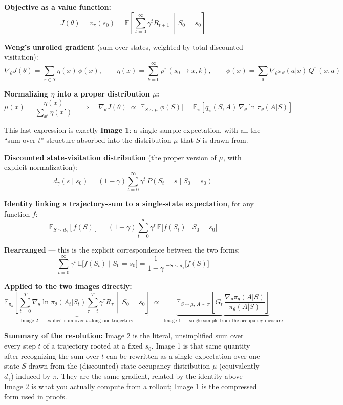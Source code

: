 \begin{tcolorbox}[title = Reason for equivalence, breakable]

    \textbf{Objective as a value function:}
    \[
    J(\theta) = v_\pi(s_0) = \mathbb{E}\left[\sum_{t=0}^{\infty}\gamma^t R_{t+1} \,\middle|\, S_0 = s_0\right]
    \]

    \textbf{Weng's unrolled gradient} (sum over states, weighted by total discounted visitation):
    \[
    \nabla_\theta J(\theta) = \sum_{x \in \mathcal{S}} \eta(x)\,\phi(x), 
    \qquad 
    \eta(x) = \sum_{k=0}^{\infty} \rho^\pi(s_0 \to x, k),
    \qquad 
    \phi(x) = \sum_{a} \nabla_\theta \pi_\theta(a|x)\, Q^\pi(x,a)
    \]

    \textbf{Normalizing $\eta$ into a proper distribution $\mu$:}
    \[
    \mu(x) = \frac{\eta(x)}{\sum_{x'} \eta(x')}
    \quad\Longrightarrow\quad
    \nabla_\theta J(\theta) \;\propto\; \mathbb{E}_{S \sim \mu}\big[\phi(S)\big] 
    = \mathbb{E}_\pi\left[q_\pi(S,A)\,\nabla_\theta \ln \pi_\theta(A|S)\right]
    \]

    This last expression is exactly \textbf{Image 1}: a single-sample expectation, with all the ``sum over $t$'' structure absorbed into the distribution $\mu$ that $S$ is drawn from.

    \textbf{Discounted state-visitation distribution} (the proper version of $\mu$, with explicit normalization):
    \[
    d_\gamma(s \mid s_0) = (1-\gamma)\sum_{t=0}^{\infty} \gamma^t\, P(S_t = s \mid S_0 = s_0)
    \]

    \textbf{Identity linking a trajectory-sum to a single-state expectation}, for any function $f$:
    \[
    \mathbb{E}_{S \sim d_\gamma}[f(S)] = (1-\gamma)\sum_{t=0}^{\infty} \gamma^t\, \mathbb{E}\big[f(S_t) \mid S_0 = s_0\big]
    \]

    \textbf{Rearranged} --- this is the explicit correspondence between the two forms:
    \[
    \sum_{t=0}^{\infty} \gamma^t\, \mathbb{E}\big[f(S_t) \mid S_0 = s_0\big] 
    = \frac{1}{1-\gamma}\, \mathbb{E}_{S \sim d_\gamma}\big[f(S)\big]
    \]

    \textbf{Applied to the two images directly:}
    \[
    \underbrace{\mathbb{E}_{\pi_\theta}\!\left[\sum_{t=0}^{T} \nabla_\theta \ln \pi_\theta(A_t|S_t) \sum_{\tau=t}^{T} \gamma^\tau R_\tau \,\middle|\, S_0=s_0\right]}_{\text{Image 2 --- explicit sum over } t \text{ along one trajectory}}
    \;\propto\;
    \underbrace{\mathbb{E}_{S\sim\mu,\, A\sim\pi}\!\left[G_t\,\frac{\nabla_\theta \pi_\theta(A|S)}{\pi_\theta(A|S)}\right]}_{\text{Image 1 --- single sample from the occupancy measure}}
    \]

    \textbf{Summary of the resolution:} Image 2 is the literal, unsimplified sum over every step $t$ of a trajectory rooted at a fixed $s_0$. Image 1 is that same quantity after recognizing the sum over $t$ can be rewritten as a single expectation over one state $S$ drawn from the (discounted) state-occupancy distribution $\mu$ (equivalently $d_\gamma$) induced by $\pi$. They are the same gradient, related by the identity above --- Image 2 is what you actually compute from a rollout; Image 1 is the compressed form used in proofs.
\end{tcolorbox}
